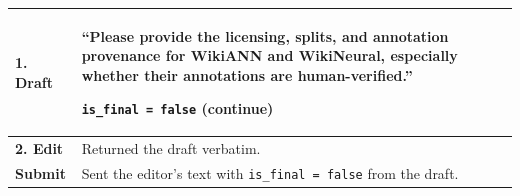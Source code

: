 \begin{minipage}{\linewidth}
\small
\setlength{\tabcolsep}{8pt}
\begin{tabularx}{\linewidth}{@{}>{\raggedright\arraybackslash}p{.16\linewidth}Y@{}}
\toprule
\textcolor{researcher}{\textbf{1. Draft}} &
“Please provide the licensing, splits, and annotation provenance for WikiANN and WikiNeural, especially whether their annotations are human-verified.”\par
\texttt{is\_final = false} (continue) \\[4pt]
\midrule
\textcolor{model}{\textbf{2. Edit}} &
Returned the draft verbatim. \\[4pt]
\midrule
\textbf{Submit} &
Sent the editor's text with \texttt{is\_final = false} from the draft. \\[4pt]
\bottomrule
\end{tabularx}
\end{minipage}
